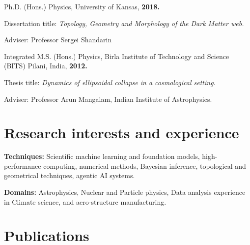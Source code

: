 \documentclass[letterpaper]{article}
\renewenvironment{itemize}{
  \begin{list}{}{
    \setlength{\leftmargin}{1.5em}
  }
}{
  \end{list}
}
\begin{document}
\begin{enumerate}
  \item Ph.D. (Hons.) Physics, University of Kansas, \textbf{2018.}
\begin{itemize} 
  \item Dissertation title: {\it Topology, Geometry and Morphology of the Dark Matter web.}
\item Adviser: Professor Sergei Shandarin
\end{itemize}
  \item Integrated M.S. (Hons.) Physics, Birla Institute of Technology and Science (BITS) Pilani, India, \textbf{2012.}
\begin{itemize}   
  \item Thesis title: {\it Dynamics of ellipsoidal collapse in a cosmological setting.}
    \item Adviser: Professor Arun Mangalam, Indian Institute of Astrophysics.
\end{itemize}
\end{enumerate}

\section*{Research interests and experience}

\textbf{Techniques:} Scientific machine learning and foundation models, high-performance computing, numerical methods, Bayesian inference, topological and geometrical techniques, agentic AI systems. 

\vspace{0.05in}
\textbf{Domains:} Astrophysics, Nuclear and Particle physics, Data analysis experience in Climate science, and aero-structure manufacturing. 



\section*{Publications}


\end{document}

